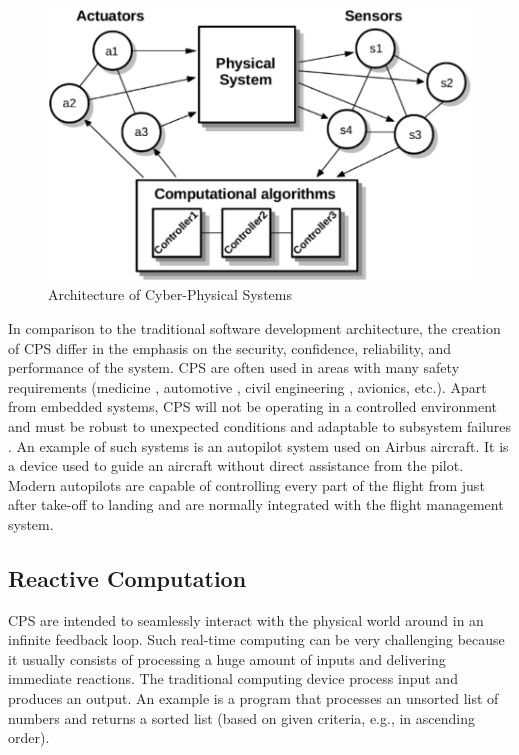 \begin{figure}
\centering
\includegraphics{pic/CPS_diagram_scaled}
\caption{Architecture of Cyber-Physical Systems}
\label{fig:CPS}
\end{figure}

In comparison to the traditional software development architecture, the creation of CPS differ in the emphasis on the security, confidence, reliability, and performance of the system. CPS are often used in areas with many safety requirements (medicine \cite{Fainekos:InsulinPump}, automotive \cite{Oehlerking:EMBS}, civil engineering \cite{Berlink:SmartHome}, avionics, etc.). Apart from embedded systems, CPS will not be operating in a controlled environment and must be robust to unexpected conditions and adaptable to subsystem failures \cite{Lee:DesignCPS}. An example of such systems is an autopilot system used on Airbus aircraft. It is a device used to guide an aircraft without direct assistance from the pilot. Modern autopilots are capable of controlling every part of the flight from just after take-off to landing and are normally integrated with the flight management system.

\subsection{Reactive Computation}

CPS are intended to seamlessly interact with the physical world around in an infinite feedback loop. Such real-time computing can be very challenging because it usually consists of processing a huge amount of inputs and delivering immediate reactions. The traditional computing device process input and produces an output. An example is a program that processes an unsorted list of numbers and returns a sorted list (based on given criteria, e.g., in ascending order).

